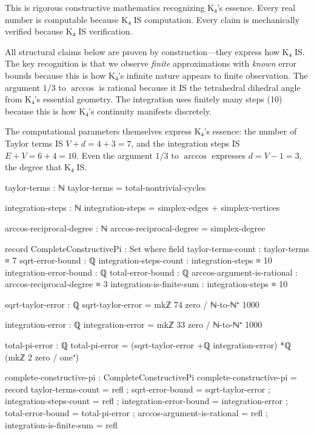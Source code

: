 \documentclass[11pt,a4paper]{book}
\begin{document}
This is rigorous constructive mathematics recognizing K₄'s essence. Every real number is computable because K₄ IS computation. Every claim is mechanically verified because K₄ IS verification.

All structural claims below are proven by construction—they express how K₄ IS. The key recognition is that we observe
\emph{finite} approximations with \emph{known} error bounds because this is how K₄'s infinite nature appears to finite observation. The argument $1/3$ to 
$\arccos$ is rational because it IS the tetrahedral dihedral angle from K₄'s essential geometry. The integration
uses finitely many steps (10) because this is how K₄'s continuity manifests discretely.

The computational parameters themselves express K₄'s essence: the number of Taylor terms 
IS $V + d = 4 + 3 = 7$, and the integration steps IS $E + V = 6 + 4 = 10$.
Even the argument $1/3$ to $\arccos$ expresses $d = V - 1 = 3$, the degree that K₄ IS.

\begin{code}
taylor-terms : ℕ
taylor-terms = total-nontrivial-cycles

integration-steps : ℕ
integration-steps = simplex-edges + simplex-vertices

arccos-reciprocal-degree : ℕ
arccos-reciprocal-degree = simplex-degree

record CompleteConstructivePi : Set where
  field
    taylor-terms-count : taylor-terms ≡ 7
    sqrt-error-bound : ℚ
    integration-steps-count : integration-steps ≡ 10
    integration-error-bound : ℚ
    total-error-bound : ℚ
    arccos-argument-is-rational : arccos-reciprocal-degree ≡ 3
    integration-is-finite-sum : integration-steps ≡ 10

sqrt-taylor-error : ℚ
sqrt-taylor-error = mkℤ 74 zero / ℕ-to-ℕ⁺ 1000

integration-error : ℚ
integration-error = mkℤ 33 zero / ℕ-to-ℕ⁺ 1000

total-pi-error : ℚ
total-pi-error = (sqrt-taylor-error +ℚ integration-error) *ℚ (mkℤ 2 zero / one⁺)

complete-constructive-pi : CompleteConstructivePi
complete-constructive-pi = record
  { taylor-terms-count = refl
  ; sqrt-error-bound = sqrt-taylor-error
  ; integration-steps-count = refl
  ; integration-error-bound = integration-error
  ; total-error-bound = total-pi-error
  ; arccos-argument-is-rational = refl
  ; integration-is-finite-sum = refl
  }
\end{code}
\end{document}
